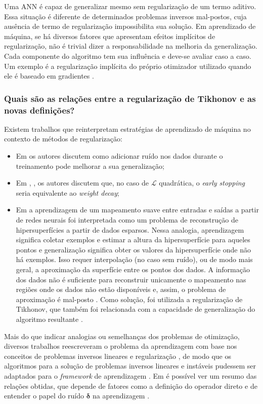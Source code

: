  Uma ANN é capaz de generalizar mesmo sem regularização de um termo aditivo. Essa situação é diferente de determinados problemas inversos mal-postos, cuja ausência de termo de regularização impossibilita sua solução. Em aprendizado de máquina, se há diversos fatores que apresentam efeitos implícitos de regularização, não é trivial dizer a responsabilidade na melhoria da generalização. Cada componente do algoritmo tem sua influência e deve-se avaliar caso a caso. Um exemplo é  a regularização implícita do próprio otimizador utilizado quando ele é baseado em gradientes \cite{Barrett2021, Razin2020, Razin2021}. 
 
 \subsubsection{Quais são as relações entre a regularização de Tikhonov e as novas definições?}

Existem trabalhos que reinterpretam estratégias de aprendizado de máquina no contexto de métodos de regularização:
\begin{itemize}
\item Em \cite{Bishop1995} os autores discutem como adicionar ruído nos dados durante o treinamento pode melhorar a sua generalização;
\item Em \cite[pág. 345]{Bishop1995book}, \cite{Collobert2004}, os autores discutem que, no caso de $\mathcal{L}$ quadrática, o \textit{early stopping} seria equivalente ao \textit{weight decay};
\item Em \cite{Poggio1990} a aprendizagem de um mapeamento suave entre entradas e saídas a partir de redes neurais foi interpretada como um problema de reconstrução de hipersuperfícies a partir de dados esparsos. Nessa analogia, aprendizagem significa coletar exemplos e estimar a altura da hipersuperfície para aqueles pontos e generalização significa obter os valores da hipersuperfície onde não há exemplos. Isso requer interpolação (no caso sem ruído), ou de modo mais geral, a aproximação da superfície entre os pontos dos dados. A informação dos dados não é suficiente para reconstruir unicamente o mapeamento nas regiões onde os dados não estão disponíveis e, assim, o problema de aproximação é mal-posto \cite{Burger2003, Poggio1990}. Como solução, foi utilizada a regularização de Tikhonov, que também foi relacionada com a capacidade de generalização do algoritmo resultante \cite{Krkov2004, Krkov2005}.
\end{itemize}

Mais do que indicar analogias ou semelhanças dos problemas de otimização, diversos trabalhos reescreveram o problema da aprendizagem com base nos conceitos de problemas inversos lineares e regularização \cite{Burger2000, girosi1995,  Krkov2012, Lu2013, devito2005}, de modo que os algoritmos para a solução de problemas inversos lineares e instáveis pudessem ser adaptados para o \textit{framework} de aprendizagem \cite{Prato2008}. Em \cite[Tabela 1]{devito2005} é possível ver um resumo das relações obtidas, que depende de fatores como a definição do operador direto e de entender o papel do ruído $\bm{\delta}$ na aprendizagem \cite{devito2005}. 

